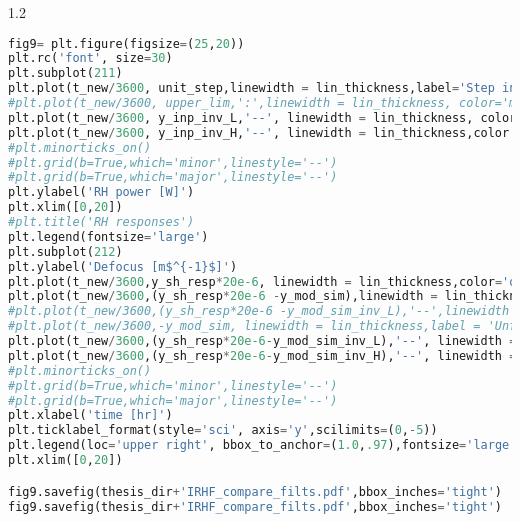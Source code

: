 \begin{spacing}{1.2} \begin{lstlisting}[frame=single,language=Python]
fig9= plt.figure(figsize=(25,20))
plt.rc('font', size=30)
plt.subplot(211)
plt.plot(t_new/3600, unit_step,linewidth = lin_thickness,label='Step input', color= 'purple')
#plt.plot(t_new/3600, upper_lim,':',linewidth = lin_thickness, color='magenta', label='RH upper limit')
plt.plot(t_new/3600, y_inp_inv_L,'--', linewidth = lin_thickness, color = 'green',label='Filtered input(H$^{-1}$(s)G$_{2}$(s))')
plt.plot(t_new/3600, y_inp_inv_H,'--', linewidth = lin_thickness,color = 'red', label='Filtered input (H$^{-1}$(s)G$_{1}$(s))')
#plt.minorticks_on()
#plt.grid(b=True,which='minor',linestyle='--')
#plt.grid(b=True,which='major',linestyle='--')
plt.ylabel('RH power [W]')
plt.xlim([0,20])
#plt.title('RH responses')
plt.legend(fontsize='large')
plt.subplot(212)
plt.ylabel('Defocus [m$^{-1}$]')
plt.plot(t_new/3600,y_sh_resp*20e-6, linewidth = lin_thickness,color='orange',label ='self heating with no RH')
plt.plot(t_new/3600,(y_sh_resp*20e-6 -y_mod_sim),linewidth = lin_thickness,label='self heating + RH w/ step input',color='purple')
#plt.plot(t_new/3600,(y_sh_resp*20e-6 -y_mod_sim_inv_L),'--',linewidth = lin_thickness,label='self heating + RH w/ filtered input',color='green')
#plt.plot(t_new/3600,-y_mod_sim, linewidth = lin_thickness,label = 'Unfiltered step input',color='purple')
plt.plot(t_new/3600,(y_sh_resp*20e-6-y_mod_sim_inv_L),'--', linewidth = lin_thickness,color='green',label ='Filtered input (H$^{-1}$(s)G$_{2}$(s))')
plt.plot(t_new/3600,(y_sh_resp*20e-6-y_mod_sim_inv_H),'--', linewidth = lin_thickness,color='red',label ='Filtered input (H$^{-1}$(s)G$_{1}$(s))')
#plt.minorticks_on()
#plt.grid(b=True,which='minor',linestyle='--')
#plt.grid(b=True,which='major',linestyle='--')
plt.xlabel('time [hr]')
plt.ticklabel_format(style='sci', axis='y',scilimits=(0,-5))
plt.legend(loc='upper right', bbox_to_anchor=(1.0,.97),fontsize='large')
plt.xlim([0,20])

fig9.savefig(thesis_dir+'IRHF_compare_filts.pdf',bbox_inches='tight')
fig9.savefig(thesis_dir+'IRHF_compare_filts.pdf',bbox_inches='tight')
\end{lstlisting} \end{spacing}


